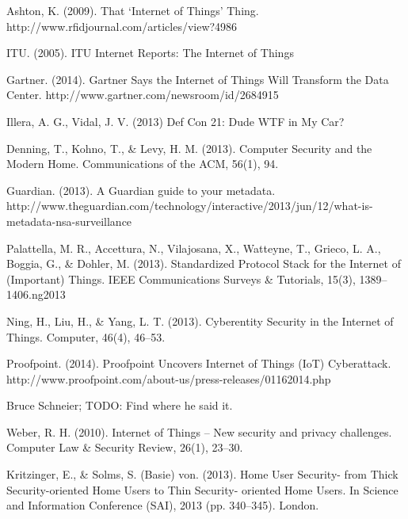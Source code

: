 \documentclass[10pt,journal,compsoc]{IEEEtran}
\begin{document}
\begin{thebibliography}{1}

Ashton, K. (2009). That `Internet of Things' Thing. http://www.rfidjournal.com/articles/view?4986

ITU. (2005). ITU Internet Reports: The Internet of Things

Gartner. (2014). Gartner Says the Internet of Things Will Transform the Data Center. http://www.gartner.com/newsroom/id/2684915

Illera, A. G., Vidal, J. V. (2013) Def Con 21: Dude WTF in My Car?  

Denning, T., Kohno, T., \& Levy, H. M. (2013). Computer Security and the Modern Home. Communications of the ACM, 56(1), 94. 

Guardian. (2013). A Guardian guide to your metadata. http://www.theguardian.com/technology/interactive/2013/jun/12/what-is-metadata-nsa-surveillance

Palattella, M. R., Accettura, N., Vilajosana, X., Watteyne, T., Grieco, L. A., Boggia, G., \& Dohler, M. (2013). Standardized Protocol Stack for the Internet of (Important) Things. IEEE Communications Surveys \& Tutorials, 15(3), 1389–1406.ng2013 

Ning, H., Liu, H., \& Yang, L. T. (2013). Cyberentity Security in the Internet of Things. Computer, 46(4), 46–53. 

Proofpoint. (2014). Proofpoint Uncovers Internet of Things (IoT) Cyberattack. http://www.proofpoint.com/about-us/press-releases/01162014.php

Bruce Schneier; TODO: Find where he said it.

Weber, R. H. (2010). Internet of Things – New security and privacy challenges. Computer Law \& Security Review, 26(1), 23–30. 

Kritzinger, E., \& Solms, S. (Basie) von. (2013). Home User Security- from Thick Security-oriented Home Users to Thin Security- oriented Home Users. In Science and Information Conference (SAI), 2013 (pp. 340–345). London.

\end{thebibliography}



\end{document}
